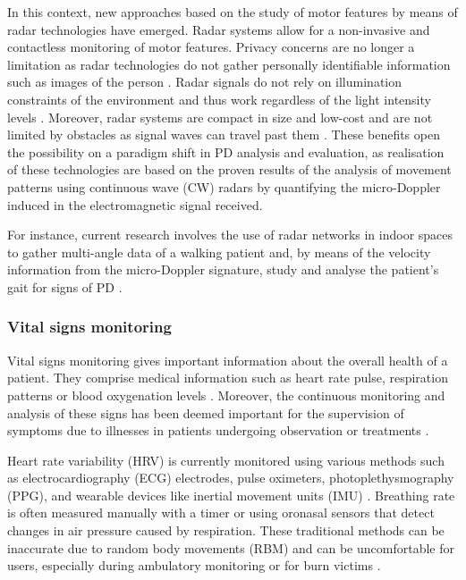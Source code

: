 	In this context, new approaches based on the study of motor features by means of radar technologies have emerged. Radar systems allow for a non-invasive and contactless monitoring of motor features. Privacy concerns are no longer a limitation as radar technologies do not gather personally identifiable information such as images of the person \cite{Amin2017}. Radar signals do not rely on illumination constraints of the environment and thus work regardless of the light intensity levels \cite{Richards2010}. Moreover, radar systems are compact in size and low-cost and are not limited by obstacles as signal waves can travel past them \cite{Richards2010}. These benefits open the possibility on a paradigm shift in PD analysis and evaluation, as realisation of these technologies are based on the proven results of the analysis of movement patterns using continuous wave (CW) radars \cite{Seifert2019, Biase2020} by quantifying the micro-Doppler induced in the electromagnetic signal received.
	
	For instance, current research involves the use of radar networks in indoor spaces to gather multi-angle data of a walking patient and, by means of the velocity information from the micro-Doppler signature, study and analyse the patient's gait for signs of PD \cite{Liu2022,Seifert2019}.
	
	\subsubsection{Vital signs monitoring}
	
	Vital signs monitoring gives important information about the overall health of a patient. They comprise medical information such as heart rate pulse, respiration patterns or blood oxygenation levels \cite{Iyer2022}. Moreover, the continuous monitoring and analysis of these signs has been deemed important for the supervision of symptoms due to illnesses in patients undergoing observation or treatments \cite{Prgomet2016,Weenk2017,Villarroel2014}.
	
	Heart rate variability (HRV) is currently monitored using various methods such as electrocardiography (ECG) electrodes, pulse oximeters, photoplethysmography (PPG), and wearable devices like inertial movement units (IMU) \cite{Antolinos2020, Lv2018}. Breathing rate is often measured manually with a timer or using oronasal sensors that detect changes in air pressure caused by respiration. These traditional methods can be inaccurate due to random body movements (RBM) and can be uncomfortable for users, especially during ambulatory monitoring or for burn victims \cite{Antolinos2020}.
	
